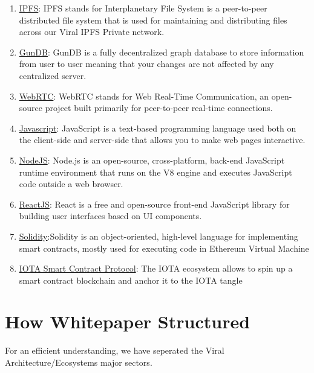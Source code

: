 \documentclass[10pt]{article}
\begin{document}
	\begin{enumerate}

	\item \hyperlink{https://ipfs.io}{IPFS}: IPFS stands for Interplanetary File System is a peer-to-peer distributed file system that is used for maintaining and distributing files across our Viral IPFS Private network.

	\item \hyperlink{https://gun.eco/}{GunDB}: GunDB is a fully decentralized graph database to store information from user to user meaning that your changes are not affected by any centralized server.

	\item \hyperlink{https://webrtc.org/}{WebRTC}: WebRTC stands for Web Real-Time Communication, an open-source project built primarily for peer-to-peer real-time connections.

	\item \hyperlink{https://www.javascript.com/}{Javascript}: JavaScript is a text-based programming language used both on the client-side and server-side that allows you to make web pages interactive.

	\item \hyperlink{https://nodejs.org/}{NodeJS}: Node.js is an open-source, cross-platform, back-end JavaScript runtime environment that runs on the V8 engine and executes JavaScript code outside a web browser.

	\item \hyperlink{https://reactjs.org/}{ReactJS}: React is a free and open-source front-end JavaScript library for building user interfaces based on UI components.

	\item \hyperlink{https://docs.soliditylang.org/}{Solidity}:Solidity is an object-oriented, high-level language for implementing smart contracts, mostly used for executing code in Ethereum Virtual Machine

	\item \hyperlink{https://wiki.iota.org/smart-contracts/overview}{IOTA Smart Contract Protocol}: The IOTA ecosystem allows to spin up a smart contract blockchain and anchor it to the IOTA tangle
	
	\end{enumerate}


\section{How Whitepaper Structured}
For an efficient understanding, we have seperated the Viral Architecture/Ecosystem\textsc{}s major sectors.\\
\end{document}
